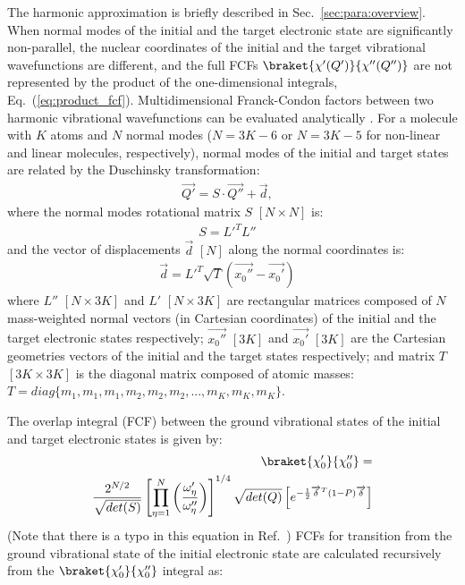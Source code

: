 \documentclass[11pt]{article}
\begin{document}
The harmonic approximation is briefly described in Sec.~\ref{sec:para:overview}.
When normal modes of the initial and the target electronic state are significantly non-parallel,
the nuclear coordinates of the initial and the target vibrational wavefunctions are different,
and the full FCFs $\braket{\chi '(Q')}{\chi'' (Q'')}$ 
are not represented by the product of the one-dimensional integrals, Eq.~(\ref{eq:product_fcf}).
Multidimensional Franck-Condon factors between two harmonic vibrational wavefunctions
can be evaluated analytically \cite{Kupka:FC:86,Duschinsky:math:98}.
For a molecule with $K$ atoms and $N$ normal modes 
($N=3K-6$ or $N=3K-5$ for non-linear and linear molecules, respectively),
normal modes of the initial and target states are related by the Duschinsky transformation\cite{Duschinky:37}:
\begin{align}
\overrightarrow{Q'}=S\cdot\overrightarrow{Q''}+\overrightarrow{d},&
\label{eq:dushinsky}
\end{align}
where the normal modes rotational matrix $S$ $[N\times N]$ is:
\begin{align}
S=L'^TL''&\nonumber
\end{align}
and the vector of displacements $\overrightarrow{d}$ $[N]$ along the normal coordinates is:
\begin{align}
\overrightarrow{d}=L'^T\sqrt{T}(\overrightarrow{x_0''}-\overrightarrow{x_0'})&\nonumber
\end{align}
where $L''$ $[N\times 3K]$ and $L'$ $[N\times 3K]$ are rectangular matrices composed of $N$ mass-weighted normal vectors
(in Cartesian coordinates) of the initial and the target electronic states respectively;
$\overrightarrow{x_0''}$ $[3K]$ and $\overrightarrow{x_0'}$ $[3K]$ are the Cartesian geometries vectors
of the initial and the target states respectively; and matrix $T$ $[3K\times 3K]$ 
is the diagonal matrix composed of atomic masses: $T=diag\{m_1,m_1,m_1,m_2,m_2,m_2,...,m_K,m_K,m_K\}$.

The overlap integral (FCF) between the ground vibrational states of the initial and target electronic states is
given by\cite{Duschinsky:math:98}:
\begin{align}
\braket{\chi'_0}{\chi''_0}=&\nonumber\\
\frac{2^{N/2}}{\sqrt{det(S)}}
\left[ \prod_{\eta=1}^{N} \left(\frac{\omega'_{\eta}}{\omega''_{\eta}}\right)  \right]^{1/4}
\sqrt{det(Q)}
\left[e^{-\frac{1}{2}\overrightarrow{\delta}^T(1-P)\overrightarrow{\delta}} \right]&
\end{align}
(Note that there is a typo in this equation in Ref.~\cite{Duschinsky:math:98})
FCFs for transition from the ground vibrational state of the initial electronic 
state are calculated recursively\cite{Duschinsky:math:98} from the 
$\braket{\chi'_0}{\chi''_0}$ integral as:
\end{document}
